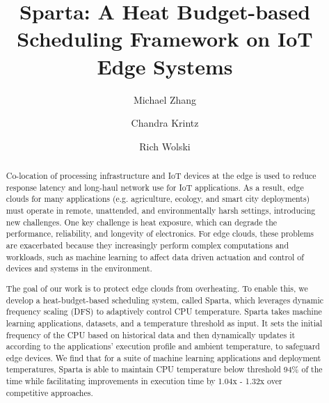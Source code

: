 \documentclass[runningheads]{llncs}
\begin{document}
%

\title{Sparta: A Heat Budget-based Scheduling Framework on IoT Edge Systems}

%
%


\author{Michael Zhang \and
Chandra Krintz \and
Rich Wolski}


%
\maketitle              %
%


\begin{abstract}
Co-location of processing infrastructure and IoT devices at the edge is used to reduce response latency and long-haul network use for IoT applications. As a result, edge clouds for many applications (e.g. agriculture, ecology, and smart city deployments) must operate in remote, unattended, and environmentally harsh settings, introducing new challenges. One key challenge is heat exposure, which can degrade the performance, reliability, and longevity of electronics. For edge clouds, these problems are exacerbated because they increasingly perform complex computations and workloads, such as machine learning to affect data driven actuation and control of devices and systems in the environment.

\vspace{0.08in}
The goal of our work is to protect edge clouds from overheating. To enable this, we develop a heat-budget-based scheduling system, called Sparta, which leverages dynamic frequency scaling (DFS) to adaptively control CPU temperature. Sparta takes machine learning applications, datasets, and a temperature threshold as input. It sets the initial frequency of the CPU based on historical data and then dynamically updates it according to the applications' execution  profile and ambient temperature, to safeguard edge devices. We find that for a suite of machine learning applications and deployment temperatures, Sparta is able to maintain CPU temperature below threshold 94\% of the time while facilitating improvements in execution time by 1.04x - 1.32x over competitive approaches.


\end{abstract}
%
%
%
\end{document}
